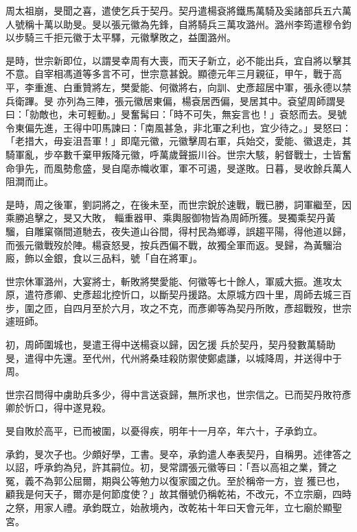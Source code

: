 \begin{pinyinscope}
 周太祖崩，旻聞之喜，遣使乞兵于契丹。契丹遣楊袞將鐵馬萬騎及奚諸部兵五六萬人號稱十萬以助旻。旻以張元徽為先鋒，自將騎兵三萬攻潞州。潞州李筠遣穆令鈞以步騎三千拒元徽于太平驛，元徽擊敗之，益圍潞州。



 是時，世宗新即位，以謂旻幸周有大喪，而天子新立，必不能出兵，宜自將以擊其不意。自宰相馮道等多言不可，世宗意甚銳。顯德元年三月親征，甲午，戰于高平，李重進、白重贊將左，樊愛能、何徽將右，向訓、史彥超居中軍，張永德以禁兵衛蹕。旻
 亦列為三陣，張元徽居東偏，楊袞居西偏，旻居其中。袞望周師謂旻曰：「勍敵也，未可輕動。」旻奮髯曰：「時不可失，無妄言也！」袞怒而去。旻號令東偏先進，王得中叩馬諫曰：「南風甚急，非北軍之利也，宜少待之。」旻怒曰：「老措大，毋妄沮吾軍！」即麾元徽，元徽擊周右軍，兵始交，愛能、徽退走，其騎軍亂，步卒數千棄甲叛降元徽，呼萬歲聲振川谷。世宗大駭，躬督戰士，士皆奮命爭先，而風勢愈盛，旻自麾赤幟收軍，軍不可遏，旻遂敗。日暮，旻收餘兵萬人阻澗而止。



 是時，周之後軍，劉詞將之，在後未至，而世宗銳於速戰，戰已勝，詞軍繼至，因乘勝追擊之，旻又大敗，
 輜重器甲、乘輿服御物皆為周師所獲。旻獨乘契丹黃騮，自雕窠嶺間道馳去，夜失道山谷間，得村民為鄉導，誤趨平陽，得他道以歸，而張元徽戰歿於陣。楊袞怒旻，按兵西偏不戰，故獨全軍而返。旻歸，為黃騮治廄，飾以金銀，食以三品料，號「自在將軍」。



 世宗休軍潞州，大宴將士，斬敗將樊愛能、何徽等七十餘人，軍威大振。進攻太原，遣符彥卿、史彥超北控忻口，以斷契丹援路。太原城方四十里，周師去城三百步，圍之匝，自四月至於六月，攻之不克，而彥卿等為契丹所敗，彥超戰歿，世宗遽班師。



 初，周師圍城也，旻遣王得中送楊袞以歸，因乞援
 兵於契丹，契丹發數萬騎助旻，遣得中先還。至代州，代州將桑珪殺防禦使鄭處謙，以城降周，并送得中于周。



 世宗召問得中虜助兵多少，得中言送袞歸，無所求也，世宗信之。已而契丹敗符彥卿於忻口，得中遂見殺。



 旻自敗於高平，已而被圍，以憂得疾，明年十一月卒，年六十，子承鈞立。



 承鈞，旻次子也。少頗好學，工書。旻卒，承鈞遣人奉表契丹，自稱男。述律答之以詔，呼承鈞為兒，許其嗣位。初，旻常謂張元徽等曰：「吾以高祖之業，贇之冤，義不為郭公屈爾，期與公等勉力以復家國之仇。至於稱帝一方，豈
 獲已也，顧我是何天子，爾亦是何節度使？」故其僭號仍稱乾祐，不改元，不立宗廟，四時之祭，用家人禮。承鈞既立，始赦境內，改乾祐十年曰天會元年，立七廟於顯聖宮。




\end{pinyinscope}
